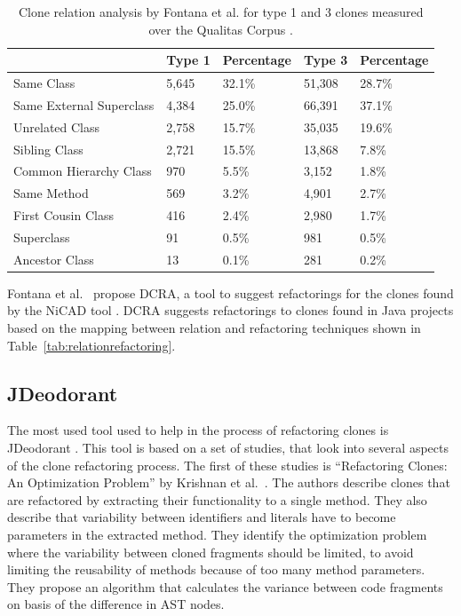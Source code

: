 \begin{table}[H]
\centering
\begin{tabular}{@{}lllll@{}}
\toprule
                         & Type 1 & Percentage & Type 3 & Percentage \\ \midrule
Same Class               & 5,645  & 32.1\%     & 51,308 & 28.7\%     \\
Same External Superclass & 4,384  & 25.0\%     & 66,391 & 37.1\%     \\
Unrelated Class          & 2,758  & 15.7\%     & 35,035 & 19.6\%     \\
Sibling Class            & 2,721  & 15.5\%     & 13,868 & 7.8\%      \\
Common Hierarchy Class   & 970    & 5.5\%      & 3,152  & 1.8\%      \\
Same Method              & 569    & 3.2\%      & 4,901  & 2.7\%      \\
First Cousin Class       & 416    & 2.4\%      & 2,980  & 1.7\%      \\
Superclass               & 91     & 0.5\%      & 981    & 0.5\%      \\
Ancestor Class           & 13     & 0.1\%      & 281    & 0.2\%      \\ \bottomrule
\end{tabular}
\caption{Clone relation analysis by Fontana et al. \cite{fontana2012duplicated} for type 1 and 3 clones measured over the Qualitas Corpus \cite{tempero2010qualitas}.}
\label{tab:dcra-relation}
\end{table}

Fontana et al.~\cite{fontana2012duplicated, fontana2015duplicated} propose DCRA, a tool to suggest refactorings for the clones found by the NiCAD tool \cite{roy2008nicad, cordy2011nicad}. DCRA suggests refactorings to clones found in Java projects based on the mapping between relation and refactoring techniques shown in Table~\ref{tab:relationrefactoring}.

\subsection{JDeodorant} \label{sec:jdeodorant}
The most used tool used to help in the process of refactoring clones is JDeodorant \cite{mazinanian2016jdeodorant}. This tool is based on a set of studies, that look into several aspects of the clone refactoring process. The first of these studies is ``Refactoring Clones: An Optimization Problem'' by Krishnan et al.~\cite{krishnan2013refactoring}. The authors describe clones that are refactored by extracting their functionality to a single method. They also describe that variability between identifiers and literals have to become parameters in the extracted method. They identify the optimization problem where the variability between cloned fragments should be limited, to avoid limiting the reusability of methods because of too many method parameters. They propose an algorithm that calculates the variance between code fragments on basis of the difference in AST nodes.

